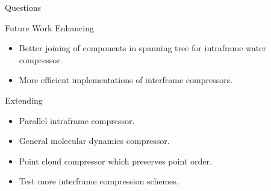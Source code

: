 \documentclass{beamer}
\begin{document}
\begin{frame}{Questions}
  \begin{center}
  \end{center}
\end{frame}

\begin{frame}{Future Work}
  Enhancing
    \begin{itemize}
      \item Better joining of components in spanning tree for intraframe water
          compressor.
            \item More efficient implementations of interframe compressors.
              \end{itemize}
                Extending
                  \begin{itemize}
                    \item Parallel intraframe compressor.
                      \item General molecular dynamics compressor.
                        \item Point cloud compressor which preserves point order.
                          \item Test more interframe compression schemes.
                            \end{itemize}
                            \end{frame}
\end{document}
